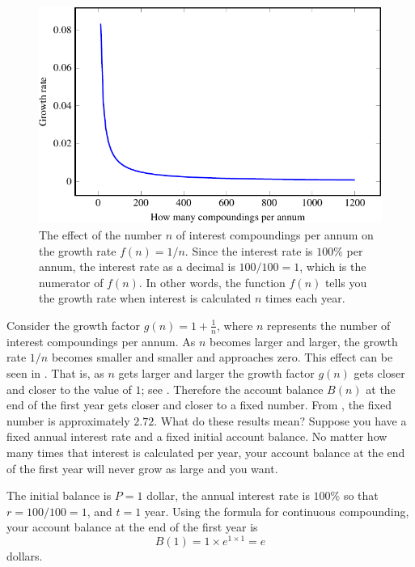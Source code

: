 \documentclass[a4paper,oneside,12pt]{article}
\begin{document}
\begin{problem}
{\begin{solution}
\begin{figure}[!htbp]
\centering
\includegraphics[scale=1.1]{image/11/e-1200-growth-rate.pdf}
\caption{%
  The effect of the number $n$ of interest compoundings per annum on
  the growth rate $f(n) = 1 / n$.  Since the interest rate is $100\%$
  per annum, the interest rate as a decimal is $100 / 100 = 1$, which
  is the numerator of $f(n)$.  In other words, the function $f(n)$
  tells you the growth rate when interest is calculated $n$ times each
  year.
}
\label{fig:exponential:e_saving_1200_growth_rate}
\end{figure}

Consider the growth factor $g(n) = 1 + \frac{1}{n}$, where $n$
represents the number of interest compoundings per annum.  As $n$
becomes larger and larger, the growth rate $1 / n$ becomes smaller and
smaller and approaches zero.  This effect can be seen in
.  That is, as $n$
gets larger and larger the growth factor $g(n)$ gets closer and closer
to the value of $1$; see
.  Therefore the account
balance $B(n)$ at the end of the first year gets closer and closer to
a fixed number.  From , the
fixed number is approximately $2.72$.  What do these results mean?
Suppose you have a fixed annual interest rate and a fixed initial
account balance.  No matter how many times that interest is calculated
per year, your account balance at the end of the first year will never
grow as large and you want.

The initial balance is $P = 1$ dollar, the annual interest rate is
$100\%$ so that $r = 100 / 100 = 1$, and $t = 1$ year.  Using the
formula for continuous compounding, your account balance at the end of
the first year is
\[
B(1)
=
1 \times e^{1 \times 1}
=
e
\]
dollars.
\end{solution}
}{}


\end{problem}
\end{document}
